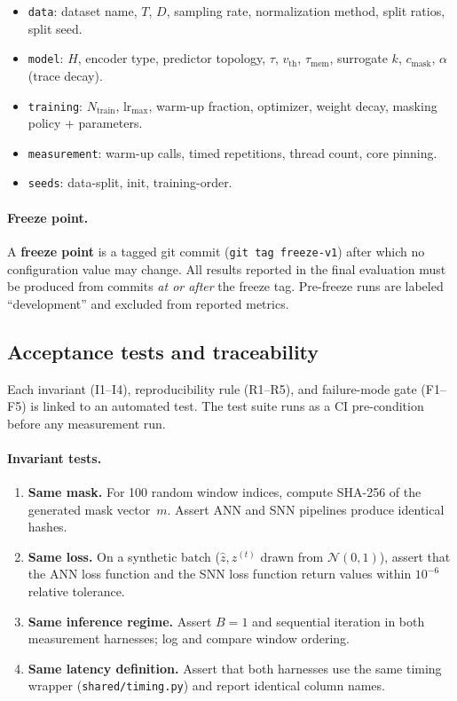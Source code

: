 \documentclass[11pt,a4paper]{article}
\begin{document}
\begin{itemize}[nosep]
\item \texttt{data}: dataset name, $T$, $D$, sampling rate, normalization
  method, split ratios, split seed.
\item \texttt{model}: $H$, encoder type, predictor topology, $\tau$,
  $v_{\text{th}}$, $\tau_{\text{mem}}$, surrogate $k$,
  $c_{\text{mask}}$, $\alpha$ (trace decay).
\item \texttt{training}: $N_{\text{train}}$, $\text{lr}_{\max}$, warm-up
  fraction, optimizer, weight decay, masking policy + parameters.
\item \texttt{measurement}: warm-up calls, timed repetitions, thread
  count, core pinning.
\item \texttt{seeds}: data-split, init, training-order.
\end{itemize}

\paragraph{Freeze point.}
A \textbf{freeze point} is a tagged git commit
(\texttt{git tag freeze-v1}) after which no configuration value may
change.  All results reported in the final evaluation must be produced
from commits \emph{at or after} the freeze tag.  Pre-freeze runs are
labeled ``development'' and excluded from reported metrics.

\subsection{Acceptance tests and traceability}\label{sec:acceptance}

Each invariant (I1--I4), reproducibility rule (R1--R5), and failure-mode
gate (F1--F5) is linked to an automated test.  The test suite runs as a
CI pre-condition before any measurement run.

\paragraph{Invariant tests.}
\begin{enumerate}[nosep,label=\textbf{T-I\arabic*.}]
\item \textbf{Same mask.}
  For 100 random window indices, compute SHA-256 of the generated mask
  vector~$m$.  Assert ANN and SNN pipelines produce identical hashes.
\item \textbf{Same loss.}
  On a synthetic batch ($\hat{z}, z^{(t)}$ drawn from $\mathcal{N}(0,1)$),
  assert that the ANN loss function and the SNN loss function return
  values within $10^{-6}$ relative tolerance.
\item \textbf{Same inference regime.}
  Assert $B=1$ and sequential iteration in both measurement harnesses;
  log and compare window ordering.
\item \textbf{Same latency definition.}
  Assert that both harnesses use the same timing wrapper
  (\texttt{shared/timing.py}) and report identical column names.
\end{enumerate}
\end{document}
